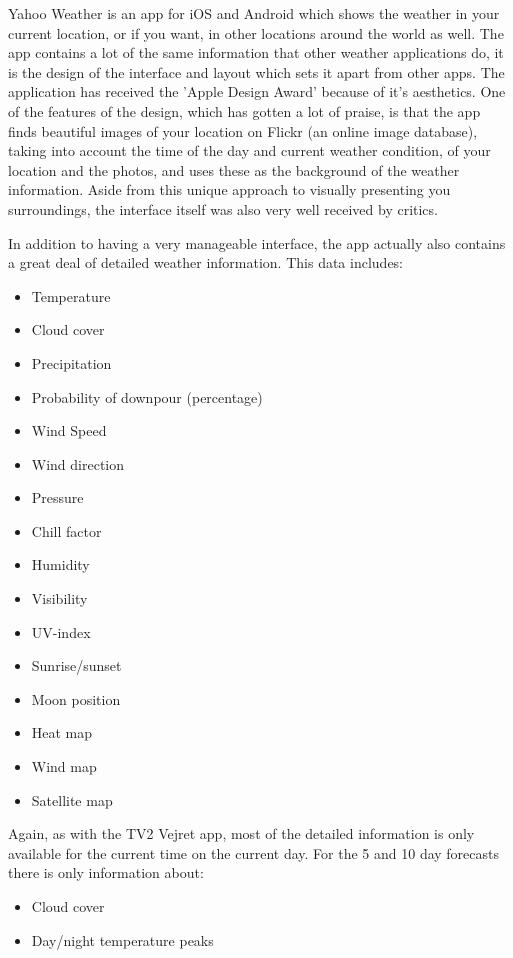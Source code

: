 Yahoo Weather is an app for iOS and Android which shows the weather in your current location, or if you want, in other locations around the world as well. 
The app contains a lot of the same information that other weather applications do, it is the design of the interface and layout which sets it apart from other apps. 
The application has received the 'Apple Design Award' because of it's aesthetics. 
One of the features of the design, which has gotten a lot of praise, is that the app finds beautiful images of your location on Flickr (an online image database), taking into account the time of the day and current weather condition, of your location and the photos, and uses these as the background of the weather information. 
Aside from this unique approach to visually presenting you surroundings, the interface itself was also very well received by critics. 


In addition to having a very manageable interface, the app actually also contains a great deal of detailed weather information. This data includes:

\begin{itemize}
    \item Temperature
    \item Cloud cover
    \item Precipitation
    \item Probability of downpour (percentage)
    \item Wind Speed
    \item Wind direction
    \item Pressure
    \item Chill factor
    \item Humidity
    \item Visibility
    \item UV-index
    \item Sunrise/sunset
    \item Moon position
    \item Heat map
    \item Wind map
    \item Satellite map
\end{itemize}

Again, as with the TV2 Vejret app, most of the detailed information is only available for the current time on the current day. 
For the 5 and 10 day forecasts there is only information about:

\begin{itemize}
    \item Cloud cover
    \item Day/night temperature peaks
\end{itemize}

